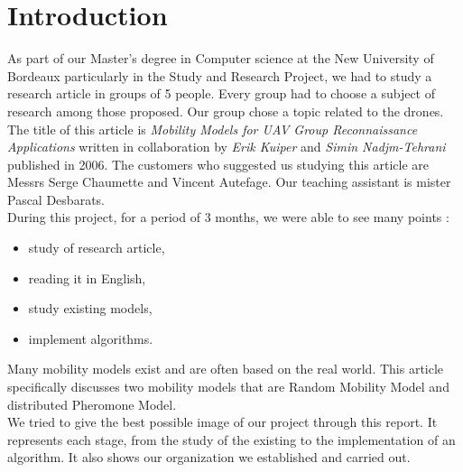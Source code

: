 \chapter*{Introduction}

As part of our Master's degree in Computer science at the New University of Bordeaux particularly in the Study and Research Project, we had to study a research article in groups of 5 people. Every group had to choose a subject of research among those proposed. Our group chose a topic related to the drones. The title of this article is \textit{Mobility Models for UAV Group Reconnaissance Applications} written in collaboration by \textit{Erik Kuiper} and \textit{Simin Nadjm-Tehrani} published in 2006. The customers who suggested us studying this article are Messrs Serge Chaumette and Vincent Autefage. Our teaching assistant is mister Pascal Desbarats.\\

During this project, for a period of 3 months, we were able to see many points :
\begin{itemize}
\item study of research article,
\item reading it in English,
\item study existing models,
\item implement algorithms.
\end{itemize}

Many mobility models exist and are often based on the real world.
This article specifically discusses two mobility models that are Random Mobility Model and distributed Pheromone Model.\\

We tried to give the best possible image of our project through this report. It represents each stage, from the study of the existing to the implementation of an algorithm. It also shows our organization we established and carried out. 
